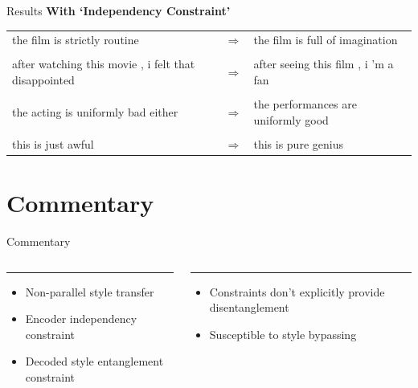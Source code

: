 \documentclass{beamer}
\begin{document}
\begin{frame}{Results}
	\centering
	{\large \textbf{With `Independency Constraint'}} \\
	\vspace{1cm}
	\small
	\begin{tabular}{ p{.4\linewidth} p{.05\linewidth} p{.4\linewidth} }
		the film is strictly routine                         & $\Rightarrow$ & the film is full of imagination     \\  \\
		after watching this movie , i felt that disappointed & $\Rightarrow$ & after seeing this film , i 'm a fan \\  \\
		the acting is uniformly bad either                   & $\Rightarrow$ & the performances are uniformly good \\  \\
		this is just awful                                   & $\Rightarrow$ & this is pure genius
	\end{tabular}
\end{frame}

\section{Commentary}
\begin{frame}{Commentary}
	\begin{columns}[T] %
		\begin{column}{.48\textwidth}
			\color{tropicalrainforest}\rule{\linewidth}{4pt}
			\begin{itemize}
				\item Non-parallel style transfer
				\item Encoder independency constraint
				\item Decoded style entanglement constraint
			\end{itemize}
		\end{column}
		\hfill
		\begin{column}{.48\textwidth}
			\color{usccardinal}\rule{\linewidth}{4pt}
			\begin{itemize}
				\item Constraints don't explicitly provide disentanglement
				\item Susceptible to style bypassing
			\end{itemize}
		\end{column}
	\end{columns}
\end{frame}
\end{document}
